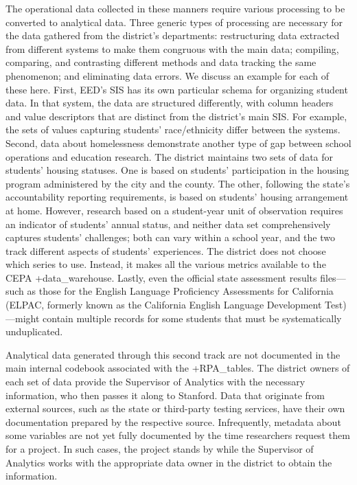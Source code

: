 \documentclass[
]{WileySix}
\begin{document}
The operational data collected in these manners require various processing to be converted to analytical data. Three generic types of processing are necessary for the data gathered from the district's departments: restructuring data extracted from different systems to make them congruous with the main data; compiling, comparing, and contrasting different methods and data tracking the same phenomenon; and eliminating data errors. We discuss an example for each of these here. First, EED's SIS has its own particular schema for organizing student data. In that system, the data are structured differently, with column headers and value descriptors that are distinct from the district's main SIS. For example, the sets of values capturing students' race/ethnicity differ between the systems. Second, data about homelessness demonstrate another type of gap between school operations and education research. The district maintains two sets of data for students' housing statuses. One is based on students' participation in the housing program administered by the city and the county. The other, following the state's accountability reporting requirements, is based on students' housing arrangement at home. However, research based on a student-year unit of observation requires an indicator of students' annual status, and neither data set comprehensively captures students' challenges; both can vary within a school year, and the two track different aspects of students' experiences. The district does not choose which series to use. Instead, it makes all the various metrics available to the CEPA +data\_warehouse\textbar. Lastly, even the official state assessment results files---such as those for the English Language Proficiency Assessments for California (ELPAC, formerly known as the California English Language Development Test)---might contain multiple records for some students that must be systematically unduplicated.

Analytical data generated through this second track are not documented in the main internal codebook associated with the +RPA\_tables\textbar. The district owners of each set of data provide the Supervisor of Analytics with the necessary information, who then passes it along to Stanford. Data that originate from external sources, such as the state or third-party testing services, have their own documentation prepared by the respective source. Infrequently, metadata about some variables are not yet fully documented by the time researchers request them for a project. In such cases, the project stands by while the Supervisor of Analytics works with the appropriate data owner in the district to obtain the information.
\end{document}
